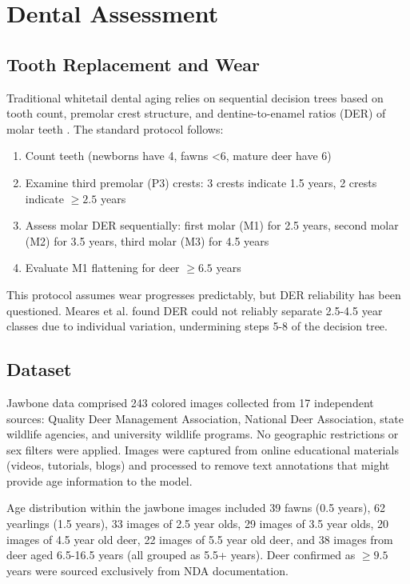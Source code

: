 \documentclass{iopjournal}
\begin{document}
\section{Dental Assessment}

\subsection{Tooth Replacement and Wear}

Traditional whitetail dental aging relies on sequential decision trees based on tooth count, premolar crest structure, and dentine-to-enamel ratios (DER) of molar teeth \cite{1949severinghaus, 1980larson}. The standard protocol follows:

\begin{enumerate}
    \item Count teeth (newborns have 4, fawns <6, mature deer have 6)
    \item Examine third premolar (P3) crests: 3 crests indicate 1.5 years, 2 crests indicate $\geq2.5$ years
    \item Assess molar DER sequentially: first molar (M1) for 2.5 years, second molar (M2) for 3.5 years, third molar (M3) for 4.5 years
    \item Evaluate M1 flattening for deer $\geq6.5$ years
\end{enumerate}

This protocol assumes wear progresses predictably, but DER reliability has been questioned. Meares et al. \cite{2006meares} found DER could not reliably separate 2.5-4.5 year classes due to individual variation, undermining steps 5-8 of the decision tree.

\subsection{Dataset}

Jawbone data comprised 243 colored images collected from 17 independent sources: Quality Deer Management Association, National Deer Association, state wildlife agencies, and university wildlife programs. No geographic restrictions or sex filters were applied. Images were captured from online educational materials (videos, tutorials, blogs) and processed to remove text annotations that might provide age information to the model.

Age distribution within the jawbone images included 39 fawns (0.5 years), 62 yearlings (1.5 years), 33 images of 2.5 year olds, 29 images of 3.5 year olds, 20 images of 4.5 year old deer, 22 images of 5.5 year old deer, and 38 images from deer aged 6.5-16.5 years (all grouped as 5.5+ years). Deer confirmed as $\geq9.5$ years were sourced exclusively from NDA documentation.
\end{document}
